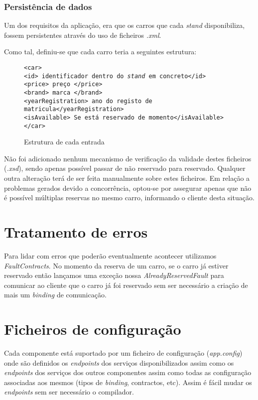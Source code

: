 \documentclass[a4paper]{article}
\begin{document}
\subsubsection{Persistência de dados}

Um dos requisitos da aplicação, era que os carros que cada \emph{stand} disponibiliza, fossem persistentes através do uso de ficheiros \emph{.xml}. 

Como tal, definiu-se que cada carro teria a seguintes estrutura:

\begin{figure}[H]
	\begin{framed}
		\texttt{<car> \\
					\hspace*{5mm}<id> identificador dentro do \emph{stand} em concreto</id> \\
					\hspace*{5mm}<price> preço </price>\\
					\hspace*{5mm}<brand> marca </brand>\\
					\hspace*{5mm}<yearRegistration> ano do registo de matricula</yearRegistration>\\
					\hspace*{5mm}<isAvailable> Se está reservado de momento</isAvailable>\\
			    </car>
		}		
	\end{framed}
	\caption{Estrutura de cada entrada}
  \label{fig:httpHeaderReq}
\end{figure}

Não foi adicionado nenhum mecanismo de verificação da validade destes ficheiros (\emph{.xsd}), sendo apenas possível passar de não reservado para reservado. Qualquer outra alteração terá de ser feita manualmente sobre estes ficheiros.
Em relação a problemas gerados devido a concorrência, optou-se por assegurar apenas que não é possível múltiplas reservas no mesmo carro, informando o cliente desta situação.

\section{Tratamento de erros}
Para lidar com erros que poderão eventualmente acontecer utilizamos \emph{FaultContracts}.
No momento da reserva de um carro, se o carro já estiver reservado então lançamos uma exceção nossa \emph{AlreadyReservedFault} para comunicar ao cliente que o carro já foi reservado sem ser necessário a criação de mais um \emph{binding} de comunicação.

\section{Ficheiros de configuração}
Cada componente está suportado por um ficheiro de configuração (\emph{app.config}) onde são definidos os \emph{endpoints} dos serviços disponibilizados assim como os \emph{endpoints} dos serviços dos outros componentes assim como todas as configuração associadas aos mesmos (tipos de \emph{binding}, contractos, etc). Assim é fácil mudar os \emph{endpoints} sem ser necessário o compilador.
\end{document}
